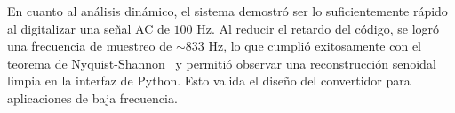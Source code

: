 \documentclass[conference]{IEEEtran}
\begin{document}
En cuanto al análisis dinámico, el sistema demostró ser lo suficientemente rápido al digitalizar una señal AC de $100\text{ Hz}$. Al reducir el retardo del código, se logró una frecuencia de muestreo de $\sim 833\text{ Hz}$, lo que cumplió exitosamente con el teorema de Nyquist-Shannon~\cite{Lesnikov2022, Wang2022} y permitió observar una reconstrucción senoidal limpia en la interfaz de Python. Esto valida el diseño del convertidor para aplicaciones de baja frecuencia.



\end{document}
